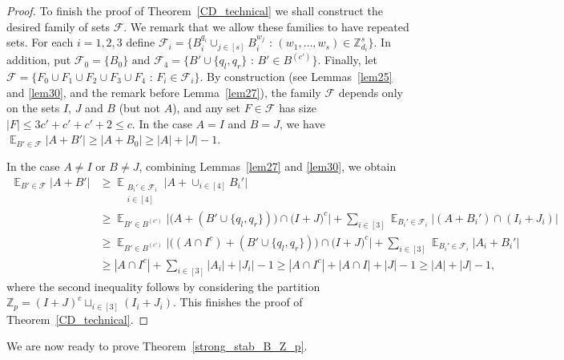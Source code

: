 \documentclass[12pt,reqno]{amsart}
\DeclareMathOperator*{\E}{\mathbb{E}}
\theoremstyle{definition}
\renewcommand\leq{\leqslant}
\renewcommand\geq{\geqslant}
\begin{document}
\begin{proof}
\vspace{5pt}
To finish the proof of Theorem~\ref{CD_technical} we shall construct the desired family of sets $\mathcal{F}$. We remark that we allow these families to have repeated sets. For each $i=1,2,3$ define
$\mathcal{F}_i=\{B_i^{q_i}\cup_{j\in [s]} B_i^{w_j} \text{ : } (w_1, \hdots, w_s) \in \mathbb{Z}^s_{d_i} \}.$
In addition, put
$\mathcal{F}_0=\{B_0\} \text{ and }\mathcal{F}_4=\{B'\cup\{q_l,q_r\} \text{ : } B'\in B^{(c')}\}.$
Finally, let
$\mathcal{F}=\{F_0\cup F_1\cup F_2\cup F_3\cup F_4 \text{ : } F_i\in \mathcal{F}_i\}.$
By construction (see  Lemmas~\ref{lem25} and \ref{lem30}, and the remark before Lemma~\ref{lem27}), the family $\mathcal{F}$ depends only on the sets $I$, $J$ and $B$ (but not $A$), and  any set $F\in \mathcal{F}$ has size
$|F| \leq 3c'+c'+c'+2\leq c. $
In the case $A=I$ and $B=J$,  we have
$\E_{B'\in \mathcal{F}}\big|A+B'\big| \geq   \big|A+B_0\big| \geq |A|+|J|-1.$

\vspace{5pt}
In the case $A\neq I$ or $B\neq J$, combining Lemmas~\ref{lem27} and \ref{lem30}, we obtain
\begin{equation*}
    \begin{split}
        \E_{B'\in \mathcal{F}}\bigg|A+B'\bigg| &\geq   \E_{\substack{B_i'\in \mathcal{F}_i \\ i \in [4]}}\bigg|A+\cup_{i\in[4]}B_i'\bigg|  \\
        &\geq \E_{B'\in B^{(c')}}\bigg|\bigg(A+(B'\cup \{q_l,q_r\})\bigg)\cap \bigg(I+J\bigg)^c\bigg|+\sum_{i\in [3]}\E_{B_i'\in \mathcal{F}_i}\bigg|(A+B_i')\cap (I_i+J_i) \bigg|\\
        &\geq \E_{B'\in B^{(c')}}\bigg|\bigg((A\cap I^c)+(B'\cup \{q_l,q_r\})\bigg) \cap \bigg(I+J \bigg)^c\bigg|+\sum_{i\in [3]}\E_{B_i'\in \mathcal{F}_i}\bigg|A_i+B_i' \bigg|\\
        &\geq |A\cap I^c|+ \sum_{i\in[3]}|A_i|+|J_i|-1
        \geq |A\cap I^c|+|A\cap I|+|J|-1
        \geq |A|+|J|-1,
    \end{split}
\end{equation*}
where the second inequality follows by considering the partition $\mathbb{Z}_p=(I+J)^c\sqcup_{i\in [3]} (I_i+J_i)$.
This finishes the proof of Theorem~\ref{CD_technical}.
\end{proof}

\vspace{5pt}
We are now ready to prove Theorem~\ref{strong_stab_B_Z_p}.
\end{document}
